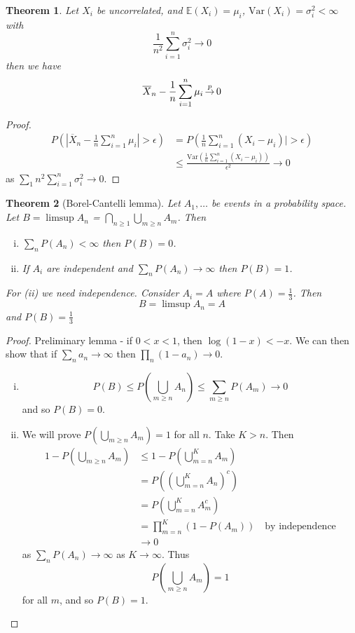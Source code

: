 \documentclass[10pt, oneside, reqno]{amsart}
\theoremstyle{plain}%
\newtheorem{thm}{Theorem}[section]
\theoremstyle{definition}
\theoremstyle{remark}
\newcommand{\var}{\text{Var}}
\newcommand{\E}{\mathbb{E}}
\def\cip{\,{\buildrel p \over \rightarrow}\,}
\begin{document}
\begin{thm}
	Let $X_i$ be uncorrelated, and $\E(X_i) = \mu_i$, $\var(X_i) = \sigma^2_i < \infty$ with \[
		\frac{1}{n^2} \sum_{i=1}^n \sigma^2_i \rightarrow 0
	\]  then we have \[
		\overline{X}_n - \frac{1}{n} \sum_{i=1}^n \mu_i \cip 0
	\]
\end{thm}
\begin{proof}
	\begin{align*} P(|\overline{X}_n - \frac{1}{n} \sum_{i=1}^n \mu_i | > \epsilon) &= P( \frac{1}{n} \sum_{i=1}^n (X_i - \mu_i)| > \epsilon) \\
		&\leq \frac{\var(\frac{1}{n}\sum_{i=1}^n (X_i - \mu_i))}{\epsilon^2} \rightarrow 0		
	\end{align*} as $\sum_{1}{n^2} \sum_{i=1}^n \sigma_i^2 \rightarrow 0$.  
\end{proof} 


\begin{thm}[Borel-Cantelli lemma]
	Let $A_1, \dots$ be events in a probability space.  Let $B = \limsup A_n$ = $\bigcap_{n \geq 1} \bigcup_{m \geq n} A_m$.  Then 
	\begin{enumerate}[(i)]
		\item $\sum_{n} P(A_n) < \infty$ then $P(B) = 0$.  
		\item If $A_i$ are independent and $\sum_n P(A_n) \rightarrow \infty$ then $P(B) = 1$.
	\end{enumerate}
	For (ii) we need independence. Consider $A_i = A$ where $P(A) = \frac{1}{3}$.  Then \[
		B = \limsup A_n = A
	\] and $P(B) = \frac{1}{3}$
\end{thm}

\begin{proof}
	Preliminary lemma - if $0 < x < 1$, then $\log(1-x) < -x$.  We can then show that if $\sum_n a_n \rightarrow \infty$ then $\prod_n (1- a_n) \rightarrow 0$.  
	
	\begin{enumerate}[(i)]
		\item \[ P(B) \leq P(\bigcup_{m \geq n} A_n) \leq \sum_{m  \geq n} P(A_m) \rightarrow 0 \] and so $P(B) = 0$.
		\item We will prove $P(\bigcup_{m \geq n} A_m) = 1$ for all $n$. Take $K > n$.  Then \begin{align*}
			1 - P(\bigcup_{m \geq n} A_m) &\leq 1 - P(\bigcup_{m=n}^K A_m) \\
										&= P( (\bigcup_{m=n}^K A_n)^c) \\
										&= P( \bigcup_{m=n}^K A_m^c) \\
										&= \prod_{m=n}^K ( 1 - P(A_m)) \quad \text{by independence} \\
										&\rightarrow 0
		\end{align*}  as $\sum_{n} P(A_n) \rightarrow \infty$ as $K \rightarrow \infty$.  Thus \[
			P(\bigcup_{m \geq n} A_m) = 1
		\] for all $m$, and so $P(B) = 1$.  
	\end{enumerate}
\end{proof}
\end{document}
